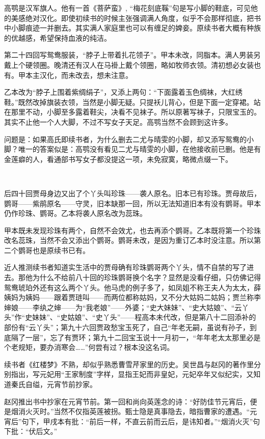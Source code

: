 \par 高鹗是汉军旗人。他有一首《菩萨蛮》, “梅花刻底鞵”句是写小脚的鞋底，可见他的美感绝对汉化。即使初续书的时候主张强调满人角度，似乎不会那样彻底，把书中小脚痕迹一并删去。其实满人家庭里也可以有缠足的婢妾。原续书者大概有种族的优越感，希望保持血液的纯洁。
\par 第二十四回写鸳鸯服装，“脖子上带着扎花领子”。甲本未改，同脂本。满人男装另戴上个硬领圈。晚清还有汉人在马褂上戴个领圈，略如牧师衣领。清初想必女装也有。甲本主汉化，而未改去，想未注意。
\par 乙本改为“脖子上围着紫绸绢子”，又添上两句：“下面露着玉色绸袜，大红绣鞋。”既然改掉旗装衣领，当然是小脚无疑。只提袄儿背心，但是下面一定穿裙。站在那里不动，小脚至多露着鞋尖，决看不见袜子。所以原著写袜子，只限宝玉的。其实不止他一个人大脚，不过不写女子天足。高鹗当然不会顾到这许多。
\par 问题是：如果高氏即续书者，为什么删去二尤与晴雯的小脚，却又添写鸳鸯的小脚？唯一的答案似是：高鹗没有看见二尤与晴雯的小脚，在他接收前已删。他是有金莲癖的人，看通部书写女子都没提这一项，未免寂寞，略微点缀一下。
\par  
\par 后四十回贾母身边又出了个丫头叫珍珠——袭人原名。旧本已有珍珠。贾母故后，鹦哥——紫鹃原名——守灵，旧本缺那一回，所以无法知道旧本有没有鹦哥。甲本仍作珍珠、鹦哥。乙本将袭人原名改为蕊珠。
\par 甲本既未发现珍珠有两个，自然不会效尤，也去再添个鹦哥。乙本既将第一个珍珠改名蕊珠，当然不会又添出个鹦哥。鹦哥未改，是因为重订乙本时没注意。所以第二个鹦哥也是原续书已有。
\par 近人推测续书者知道实生活中的贾母确有珍珠鹦哥两个丫头，情不自禁的写了进去。那他为什么不给前八十回的珍珠鹦哥换个名字？显然是没看仔细，只仿佛记得鸳鸯琥珀外还有这么两个丫头。他马虎的例子多了，如凤姐不称王夫人为太太，薛姨妈为姨妈——跟着贾琏叫——而两位都称姑妈，又不分大姑妈二姑妈；贾兰称李婶娘——李纨之婶——为“我老娘”——外婆；“史大妹妹”、“史大姑娘”、“云丫头”作“史妹妹”、“史姑娘”、“史丫头”——程高本未代改，但是第八十二回添补的部份有“云丫头”；第九十六回贾政愁宝玉死了，自己“年老无嗣，虽说有孙子，到底隔了一层”，忘了有贾环；第九十二回宝玉说十一月初一，“年年老太太那里必是个老规矩，要办消寒会……”何尝有过？根本没这名词。
\par 续书者《红楼梦》不熟，却似乎熟悉曹雪芹家里的历史。吴世昌与赵冈的著作里分别指出，写元妃用“王家制度”字样，显指王妃而非皇妃，元妃卒年又似纪实，又知道秦氏自缢，元宵节前抄家。
\par 赵冈推出书中抄家在元宵节前。第一回和尚向英莲念的诗：“好防佳节元宵后，便是烟消火灭时。”当然不仅指英莲被拐。甄士隐是真事隐去，暗指曹家的遭遇。“元宵后”句下，甲戌本有批：“前后一样，不直云前而云后，是讳知者。”“烟消火灭”句下批：“伏后文。”
